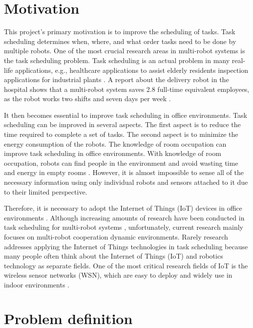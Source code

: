 \section{Motivation}
This project's primary motivation is to improve the scheduling of tasks. 
Task scheduling determines when, where, and what order tasks need to be done by multiple robots. One of the most crucial research areas in multi-robot systems is the task scheduling problem. Task scheduling is an actual problem in many real-life applications, e.g., healthcare applications to assist elderly residents \cite{retire2017} inspection applications for industrial plants \cite{Chun12}. A report about the delivery robot in the hospital shows that a multi-robot system saves 2.8 full-time equivalent employees, as the robot works two shifts and seven days per week \cite{Jeon17}. 

It then becomes essential to improve task scheduling in office environments. Task scheduling can be improved in several aspects. The first aspect is to reduce the time required to complete a set of tasks. The second aspect is to minimize the energy consumption of the robots. The knowledge of room occupation can improve task scheduling in office environments. With knowledge of room occupation, robots can find people in the environment and avoid wasting time and energy in empty rooms \cite{retire2017}. However, it is almost impossible to sense all of the necessary information using only individual robots and sensors attached to it due to their limited perspective. 

Therefore, it is necessary to adopt the Internet of Things (IoT) devices in office environments \cite{PYO2015148}. Although increasing amounts of research have been conducted in task scheduling for multi-robot systems \cite{Shah7}, unfortunately, current research mainly focuses on multi-robot cooperation dynamic environments. Rarely research addresses applying the Internet of Things technologies in task scheduling because many people often think about the Internet of Things (IoT) and robotics technology as separate fields. One of the most critical research fields of IoT is the wireless sensor networks (WSN), which are easy to deploy and widely use in indoor environments \cite{Li8334565}.






\section{Problem definition}

